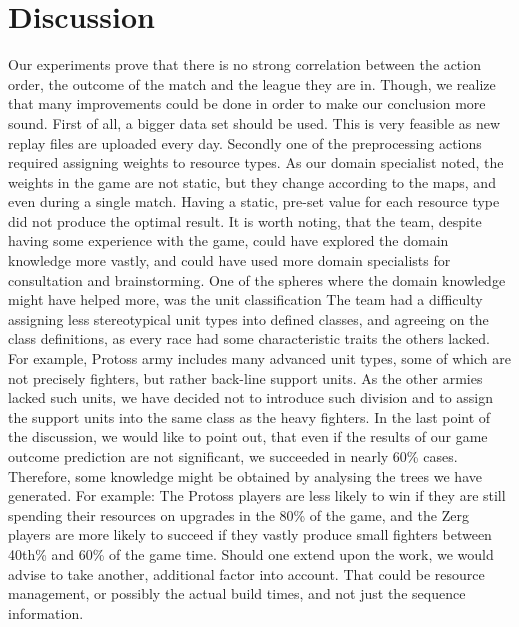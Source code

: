 \documentclass[a4paper,11pt]{article}
\begin{document}
\section{Discussion}
Our experiments prove that there is no strong correlation between the action order, the outcome of the match and the league they are in. Though, we realize that many improvements could be done in order to make our conclusion more sound.
First of all, a bigger data set should be used. This is very feasible as new replay files are uploaded every day.
Secondly one of the preprocessing actions required assigning weights to resource types. As our domain specialist noted, the weights in the game are not static, but they change according to the maps, and even during a single match. Having a static, pre-set value for each resource type did not produce the optimal result.
It is worth noting, that the team, despite having some experience with the game, could have explored the domain knowledge more vastly, and could have used more domain specialists for consultation and brainstorming. One of the spheres where the domain knowledge might have helped more, was the unit classification The team had a difficulty assigning less stereotypical unit types into defined classes, and agreeing on the class definitions, as every race had some characteristic traits the others lacked. For example, Protoss army includes many advanced unit types, some of which are not precisely fighters, but rather back-line support units. As the other armies lacked such units, we have decided not to introduce such division and to assign the support units into the same class as the heavy fighters.
In the last point of the discussion, we would like to point out, that even if the results of our game outcome prediction are not significant, we succeeded in nearly 60\% cases. Therefore, some knowledge might be obtained by analysing the trees we have generated. For example: The Protoss players are less likely to win if they are still spending their resources on upgrades in the 80\% of the game, and the Zerg players are more likely to succeed if they vastly produce small fighters between 40th\% and 60\% of the game time.
Should one extend upon the work, we would advise to take another, additional factor into account. That could be resource management, or possibly the actual build times, and not just the sequence information.
\end{document}
